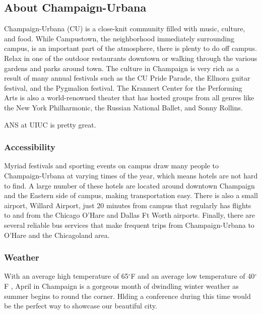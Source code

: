 \documentclass[11pt, letterpaper]{article}
\begin{document}
\subsection{About Champaign-Urbana}
Champaign-Urbana (CU) is a close-knit community filled with music, culture, and food. While Campustown, the neighborhood immediately surrounding campus,  is an important part of the atmosphere, there is plenty to do off campus. Relax in one of the outdoor restaurants downtown or walking through the various gardens and parks around town. The culture in Champaign is very rich as a result of many annual festivals such as the CU Pride Parade, the Ellnora guitar festival, and the Pygmalion festival. The Krannert Center for the Performing Arts is also a world-renowned theater that has hosted groups from all genres like the New York Philharmonic, the Russian National Ballet, and Sonny Rollins.

ANS at UIUC is pretty great.
\subsubsection{Accessibility}
Myriad festivals and sporting events on campus draw many people to Champaign-Urbana at varying times of the year, which means hotels are not hard to find. A large number of these hotels are located around downtown Champaign and the Eastern side of campus, making transportation easy. There is also a small airport, Willard Airport, just 20 minutes from campus that regularly has flights to and from the Chicago O’Hare and Dallas Ft Worth airports. Finally, there are several reliable bus services that make frequent trips from Champaign-Urbana to O’Hare and the Chicagoland area.

\subsubsection{Weather}
With an average high temperature of 65$^\circ$F and an average low temperature of 40$^\circ$F , April in Champaign is a gorgeous month of dwindling winter weather as summer begins to round the corner. Hlding a conference during this time would be the perfect way to showcase our beautiful city.
\end{document}
